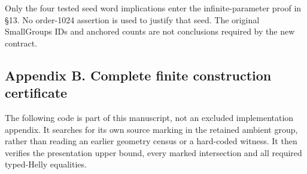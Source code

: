 \documentclass[
  10pt,
  letterpaper,
]{article}
\begin{document}
Only the four tested seed word implications enter the infinite-parameter
proof in §13. No order-1024 assertion is used to justify that seed. The
original SmallGroups IDs and anchored counts are not conclusions
required by the new contract.

\subsection{Appendix B. Complete finite construction
certificate}\label{appendix-b.-complete-finite-construction-certificate}

The following code is part of this manuscript, not an excluded
implementation appendix. It searches for its own source marking in the
retained ambient group, rather than reading an earlier geometry census
or a hard-coded witness. It then verifies the presentation upper bound,
every marked intersection and all required typed-Helly equalities.
\end{document}
